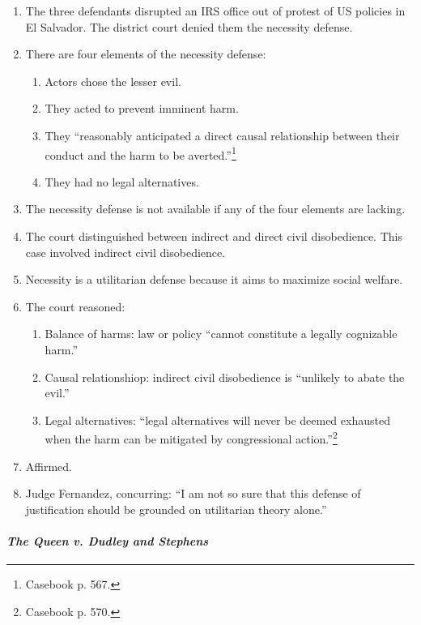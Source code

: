 \begin{enumerate}
    \item The three defendants disrupted an IRS office out of protest of US policies in El Salvador. The district court denied them the necessity defense.
    \item There are four elements of the necessity defense:
    \begin{enumerate}
        \item Actors chose the lesser evil.
        \item They acted to prevent imminent harm.
        \item They ``reasonably anticipated a direct causal relationship between their conduct and the harm to be averted.''\footnote{Casebook p. 567.}
        \item They had no legal alternatives.
    \end{enumerate}
    \item The necessity defense is not available if any of the four elements are lacking.
    \item The court distinguished between indirect and direct civil disobedience. This case involved indirect civil disobedience.
    \item Necessity is a utilitarian defense because it aims to maximize social welfare.
    \item The court reasoned:
    \begin{enumerate}
        \item Balance of harms: law or policy ``cannot constitute a legally cognizable harm.''
        \item Causal relationshiop: indirect civil disobedience is ``unlikely to abate the evil.''
        \item Legal alternatives: ``legal alternatives will never be deemed exhausted when the harm can be mitigated by congressional action.''\footnote{Casebook p. 570.}
    \end{enumerate}
    \item Affirmed.
    \item Judge Fernandez, concurring: ``I am not so sure that this defense of justification should be grounded on utilitarian theory alone.''
\end{enumerate}

\paragraph{\em{The Queen v. Dudley and Stephens}}

